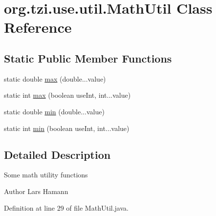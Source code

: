 \hypertarget{classorg_1_1tzi_1_1use_1_1util_1_1_math_util}{\section{org.\-tzi.\-use.\-util.\-Math\-Util Class Reference}
\label{classorg_1_1tzi_1_1use_1_1util_1_1_math_util}
}
\subsection*{Static Public Member Functions}
\begin{DoxyCompactItemize}
\item 
static double \hyperlink{classorg_1_1tzi_1_1use_1_1util_1_1_math_util_ae00c65fc54eefa6a010c595d103d52b6}{max} (double...\-value)
\item 
static int \hyperlink{classorg_1_1tzi_1_1use_1_1util_1_1_math_util_aea11e20957643c70d6fc7e3180f8d2b4}{max} (boolean use\-Int, int...\-value)
\item 
static double \hyperlink{classorg_1_1tzi_1_1use_1_1util_1_1_math_util_a8521fc538fab664cc7f37616a283fc2a}{min} (double...\-value)
\item 
static int \hyperlink{classorg_1_1tzi_1_1use_1_1util_1_1_math_util_a865166b10d41316efe4636963abdac3c}{min} (boolean use\-Int, int...\-value)
\end{DoxyCompactItemize}


\subsection{Detailed Description}
Some math utility functions \begin{DoxyAuthor}{Author}
Lars Hamann 
\end{DoxyAuthor}


Definition at line 29 of file Math\-Util.\-java.



